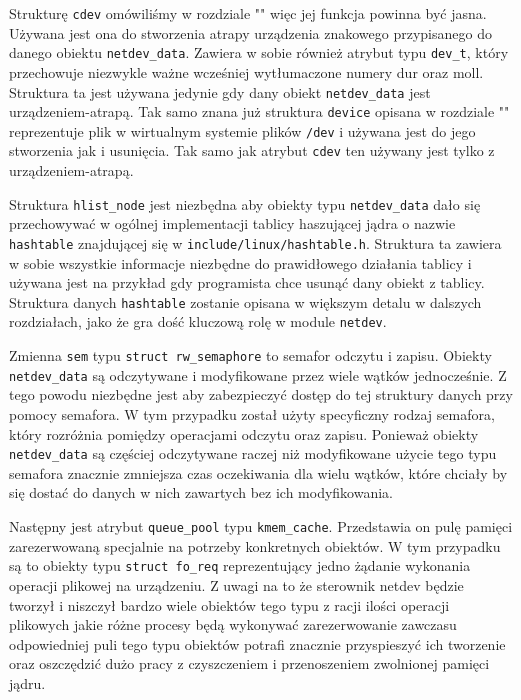 \documentclass[10pt]{scrartcl}
\begin{document}
Strukturę \texttt{cdev} omówiliśmy w rozdziale "" więc jej funkcja powinna być jasna. Używana jest ona do stworzenia atrapy urządzenia znakowego przypisanego do danego obiektu \texttt{netdev\_data}. Zawiera w sobie również atrybut typu \texttt{dev\_t}, który przechowuje niezwykle ważne wcześniej wytłumaczone numery dur oraz moll. Struktura ta jest używana jedynie gdy dany obiekt \texttt{netdev\_data} jest urządzeniem-atrapą. Tak samo znana już struktura \texttt{device} opisana w rozdziale "" reprezentuje plik w wirtualnym systemie plików \texttt{/dev} i używana jest do jego stworzenia jak i usunięcia. Tak samo jak atrybut \texttt{cdev} ten używany jest tylko z urządzeniem-atrapą.

Struktura \texttt{hlist\_node} jest niezbędna aby obiekty typu \texttt{netdev\_data} dało się przechowywać w ogólnej implementacji tablicy haszującej jądra o nazwie \texttt{hashtable} znajdującej się w \texttt{include/linux/hashtable.h}. Struktura ta zawiera w sobie wszystkie informacje niezbędne do prawidłowego działania tablicy i używana jest na przykład gdy programista chce usunąć dany obiekt z tablicy. Struktura danych \texttt{hashtable} zostanie opisana w większym detalu w dalszych rozdziałach, jako że gra dość kluczową rolę w module \texttt{netdev}.

Zmienna \texttt{sem} typu \texttt{struct rw\_semaphore} to semafor odczytu i zapisu. Obiekty \texttt{netdev\_data} są odczytywane i modyfikowane przez wiele wątków jednocześnie. Z tego powodu niezbędne jest aby zabezpieczyć dostęp do tej struktury danych przy pomocy semafora. W tym przypadku został użyty specyficzny rodzaj semafora, który rozróżnia pomiędzy operacjami odczytu oraz zapisu. Ponieważ obiekty \texttt{netdev\_data} są częściej odczytywane raczej niż modyfikowane użycie tego typu semafora znacznie zmniejsza czas oczekiwania dla wielu wątków, które chciały by się dostać do danych w nich zawartych bez ich modyfikowania.

Następny jest atrybut \texttt{queue\_pool} typu \texttt{kmem\_cache}.  Przedstawia on pulę pamięci zarezerwowaną specjalnie na potrzeby konkretnych obiektów. W tym przypadku są to obiekty typu \texttt{struct fo\_req} reprezentujący jedno żądanie wykonania operacji plikowej na urządzeniu. Z uwagi na to że sterownik netdev będzie tworzył i niszczył bardzo wiele obiektów tego typu z racji ilości operacji plikowych jakie różne procesy będą wykonywać zarezerwowanie zawczasu odpowiedniej puli tego typu obiektów potrafi znacznie przyspieszyć ich tworzenie oraz oszczędzić dużo pracy z czyszczeniem i przenoszeniem zwolnionej pamięci jądru.
\end{document}
